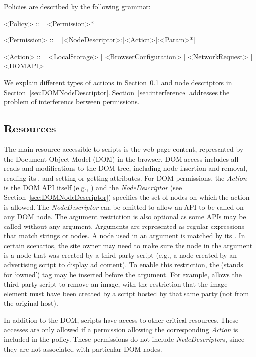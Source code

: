 Policies are described by the following grammar:

\begin{grammar}\raggedright
<Policy> ::= <Permission>*

<Permission> ::= [<NodeDescriptor>:]<Action>[:<Param>*]

<Action> ::= <LocalStorage> | <BrowserConfiguration> | <NetworkRequest> | <DOMAPI> 

\end{grammar}

\noindent
We explain different types of actions in Section~\ref{sec:resources} and
node descriptors in Section~\ref{sec:DOMNodeDescriptor}.
Section~\ref{sec:interference} addresses the problem of interference
between permissions.

\subsection{Resources}\label{sec:resources}

The main resource accessible to scripts is the web page content,
represented by the Document Object Model (DOM) in the browser.  DOM
access includes all reads and modifications to the DOM tree, including
node insertion and removal, reading its , and setting or
getting attributes.  For DOM permissions, the
\emph{Action} is the DOM API itself (e.g., ) and
the \emph{NodeDescriptor} (see Section~\ref{sec:DOMNodeDescriptor})
specifies the set of nodes on which the action is allowed.  The \emph{NodeDescriptor} can be omitted to allow an API to be called on any DOM node.  The argument restriction is also optional as some APIs may be called without any argument.
Arguments are represented as regular expressions that match strings or
nodes.  A node used in an argument is matched by
its .  In certain scenarios, the site owner may need to
make sure the node in the argument is a node that was created by a third-party script
(e.g., a node created by an advertising script to display ad content).  To enable this restriction, the
\code{[o]} (stands for `owned') tag may be inserted before the argument.  For example,
 allows the third-party script to remove an image, with the restriction that the image element must have been created by a script hosted by that same party (not from the original host).

In addition to the DOM, scripts have access to other critical resources.
These accesses are only allowed if a permission allowing the
corresponding \emph{Action} is included in the policy.  These
permissions do not include \emph{NodeDescriptor}s, since they are not
associated with particular DOM nodes.

